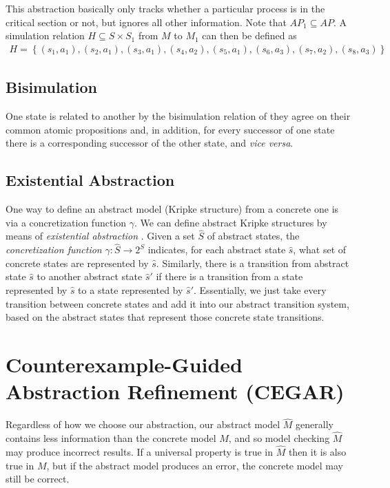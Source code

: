 \documentclass[10pt,a4paper]{article}
\begin{document}
This abstraction basically only tracks whether a particular process is in the critical section or not, but ignores all other information. Note that $AP_1 \subseteq AP$. A simulation relation $H \subseteq S \times S_1$ from $M$ to $M_1$ can then be defined as 
\begin{align*}
    H = \left\lbrace (s_1, a_1), (s_2, a_1), (s_3, a_1), (s_4, a_2), (s_5, a_1), (s_6, a_3), (s_7, a_2), (s_8, a_3) \right\rbrace
\end{align*}

\subsection*{Bisimulation}

One state is related to another by the bisimulation relation of they agree on their common atomic propositions and, in addition, for every successor of one state there is a corresponding successor of the other state, and \textit{vice versa}.

\subsection*{Existential Abstraction}

One way to define an abstract model (Kripke structure) from a concrete one is via a concretization function $\gamma$. We can define abstract Kripke structures by means of \textit{existential abstraction} \cite{94mcabs}. Given a set $\widehat{S}$ of abstract states, the \textit{concretization function} $\gamma : \widehat{S} \rightarrow 2^S$ indicates, for each abstract state $\widehat{s}$, what set of concrete states are represented by $\widehat{s}$. Similarly, there is a transition from abstract state $\widehat{s}$ to another abstract state $\widehat{s}'$ if there is a transition from a state represented by $\widehat{s}$ to a state represented by $\widehat{s}'$. Essentially, we just take every transition between concrete states and add it into our abstract transition system, based on the abstract states that represent those concrete state transitions.

\section*{Counterexample-Guided Abstraction Refinement (CEGAR)}


Regardless of how we choose our abstraction, our abstract model $\widehat{M}$ generally contains less information than the concrete model $M$, and so model checking $\widehat{M}$ may produce incorrect results. If a universal property is true in $\widehat{M}$ then it is also true in $M$, but if the abstract model produces an error, the concrete model may still be correct.
\end{document}
